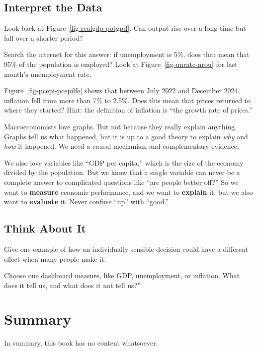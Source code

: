 \documentclass[
  letterpaper,
  DIV=11,
  numbers=noendperiod]{scrreprt}
\begin{document}
\section{Interpret the Data}\label{interpret-the-data}

Look back at Figure~\ref{fig-realgdp-potgpd}. Can output rise over a
long time but fall over a shorter period?

Search the internet for this answer: if unemployment is 5\%, does that
mean that 95\% of the population is employed? Look at
Figure~\ref{fig-unrate-nrou} for last month's unemployment rate.

Figure~\ref{fig-pcepi-pcepilfe} shows that between July 2022 and
December 2024, inflation fell from more than 7\% to 2.5\%. Does this
mean that prices returned to where they started? Hint: the definition of
inflation is ``the growth rate of prices.''

Macroeconomists love graphs. But not because they really explain
anything. Graphs tell us what happened, but it is up to a good theory to
explain \emph{why} and \emph{how} it happened. We need a causal
mechanism and complementary evidence.

We also love variables like ``GDP per capita,'' which is the size of the
economy divided by the population. But we know that a single variable
can never be a complete answer to complicated questions like ``are
people better off?'' So we want to \textbf{measure} economic
performance, and we want to \textbf{explain} it, but we also want to
\textbf{evaluate} it. Never confuse ``up'' with ``good.''

\section{Think About It}\label{think-about-it}

Give one example of how an individually sensible decision could have a
different effect when many people make it.

Choose one dashboard measure, like GDP, unemployment, or inflation. What
does it tell us, and what does it not tell us?''


\chapter{Summary}\label{summary}

In summary, this book has no content whatsoever.
\end{document}
